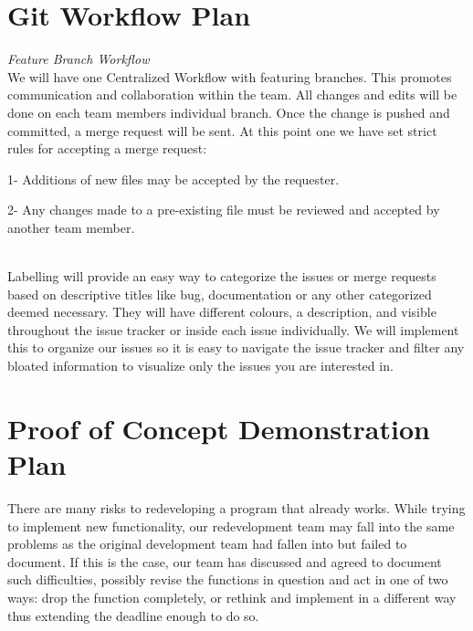 \documentclass{article}
\begin{document}
\section{Git Workflow Plan}
\textit{Feature Branch Workflow\\}
We will have one Centralized Workflow with featuring branches. This promotes communication and collaboration within the team. All changes and edits will be done on each team members individual branch. Once the change is pushed and committed, a merge request will be sent. At this point one we have set strict rules for accepting a merge request: 

1- Additions of new files may be accepted by the requester.

2- Any changes made to a pre-existing file must be reviewed and accepted by another team member.

\\

Labelling will provide an easy way to categorize the issues or merge requests based on descriptive titles like bug, documentation or any other categorized deemed necessary. They will have different colours, a description, and visible throughout the issue tracker or inside each issue individually. We will implement this to organize our issues so it is easy to navigate the issue tracker and filter any bloated information to visualize only the issues you are interested in.

\section{Proof of Concept Demonstration Plan}

\indent There are many risks to redeveloping a program that already works. While trying to implement new functionality, our redevelopment team may fall into the same problems as the original development team had fallen into but failed to document. If this is the case, our team has discussed and agreed to document such difficulties, possibly revise the functions in question and act in one of two ways: drop the function completely, or rethink and implement in a different way thus extending the deadline enough to do so. \\
\end{document}
